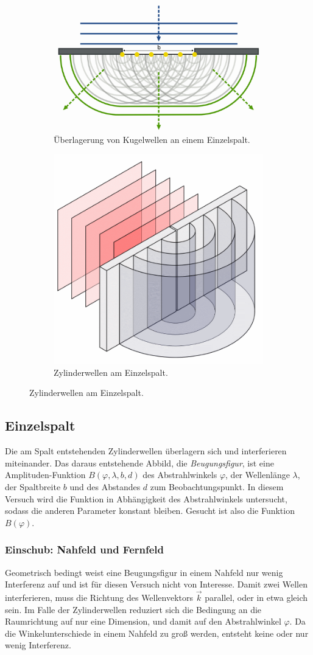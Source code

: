\begin{figure}
    \centering
    \begin{subfigure}{.5\textwidth}
      \centering
      \includegraphics[width=.45\textwidth]{plots/Huygens.png}
    \caption{Überlagerung von Kugelwellen an einem Einzelspalt.}
    \label{fig:huygens}
    \end{subfigure}%
    \begin{subfigure}{.5\textwidth}
      \centering
      \includegraphics[width=.45\linewidth]{plots/Zylinderwellen.png}
      \caption{Zylinderwellen am Einzelspalt.}
      \label{fig:zylinder}
    \end{subfigure}
    \label{fig:huygenZylinder}
\end{figure}

\subsection{Einzelspalt}
Die am Spalt entstehenden Zylinderwellen überlagern sich und interferieren miteinander. Das daraus entstehende Abbild, die \textit{Beugungsfigur}, ist eine Amplituden-Funktion $B(\varphi, \lambda, b, d)$ des Abstrahlwinkels $\varphi$,
der Wellenlänge $\lambda$, der Spaltbreite $b$ und des Abstandes $d$ zum Beobachtungspunkt.
In diesem Versuch wird die Funktion in Abhängigkeit des Abstrahlwinkels untersucht, sodass die anderen Parameter konstant bleiben.
Gesucht ist also die Funktion $B(\varphi)$.

\subsubsection{Einschub: Nahfeld und Fernfeld}
Geometrisch bedingt weist eine Beugungsfigur in einem Nahfeld nur wenig Interferenz auf und ist für diesen Versuch nicht von Interesse.
Damit zwei Wellen interferieren, muss die Richtung des Wellenvektors $\vec{k}$ parallel, oder in etwa gleich sein. Im Falle der Zylinderwellen reduziert sich %
die Bedingung an die Raumrichtung auf nur eine Dimension, und damit auf den Abstrahlwinkel $\varphi$.
Da die Winkelunterschiede in einem Nahfeld zu groß werden, entsteht keine oder nur wenig Interferenz.

